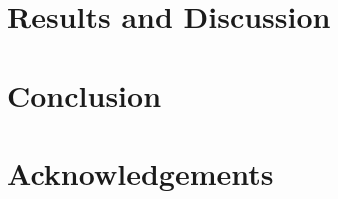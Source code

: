\documentclass[12pt]{article}
\begin{document}
  \section{Results and Discussion}
  

  \section{Conclusion}
  

  \section{Acknowledgements}
  
  
  \printbibliography[title=References]

\end{document}
